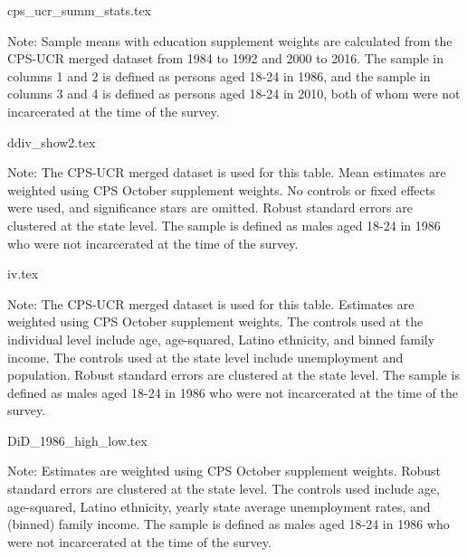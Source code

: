 
{cps_ucr_summ_stats.tex}

\begin{footnotesize}
  \noindent Note: Sample means with education supplement weights are calculated from the CPS-UCR merged dataset from 1984 to 1992 and 2000 to 2016. The sample in columns 1 and 2 is defined as persons aged 18-24 in 1986, and the sample in columns 3 and 4 is defined as persons aged 18-24 in 2010, both of whom were not incarcerated at the time of the survey.
\end{footnotesize}

\clearpage

{ddiv_show2.tex}
\begin{footnotesize}
  \noindent Note: The CPS-UCR merged dataset is used for this table.  Mean estimates are weighted using CPS October supplement weights. No controls or fixed effects were used, and significance stars are omitted. Robust standard errors are clustered at the state level. The sample is defined as males aged 18-24 in 1986 who were not incarcerated at the time of the survey. 
\end{footnotesize}

\clearpage

{iv.tex}
\begin{footnotesize}
  \noindent Note: The CPS-UCR merged dataset is used for this table. Estimates are weighted using CPS October supplement weights. The controls used at the individual level include age, age-squared, Latino ethnicity, and binned family income. The controls used at the state level include unemployment and population.
  Robust standard errors are clustered at the state level. The sample is defined as males aged 18-24 in 1986 who were not incarcerated at the time of the survey. 
\end{footnotesize}

\clearpage


{DiD_1986_high_low.tex}
\begin{footnotesize}
  \noindent Note: Estimates are weighted using CPS October supplement weights. Robust standard errors are clustered at the state level. The controls used include age, age-squared, Latino ethnicity, yearly state average unemployment rates, and (binned) family income. The sample is defined as males aged 18-24 in 1986 who were not incarcerated at the time of the survey.
\end{footnotesize}

